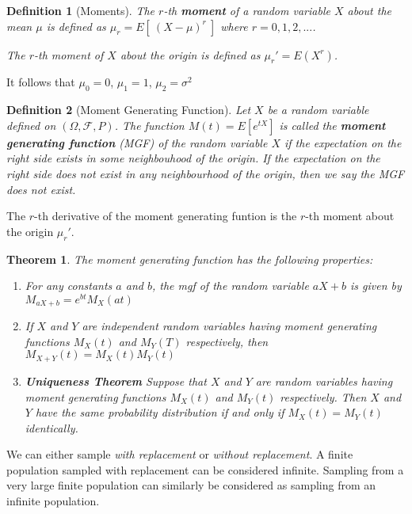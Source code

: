\documentclass[12pt,twoside]{report}
\newtheorem{defn}{Definition}
\newtheorem{thm}[subsection]{Theorem}
\begin{document}
\begin{defn}[Moments]
    The $r$-th \textbf{moment} of a random variable $X$ about the mean $\mu$ is defined as $\mu_r = E[\  (X - \mu)^r \ ]$ where $r=0, 1, 2, ...$. 

    The $r$-th moment of $X$ about the origin is defined as $\mu_r ' = E(X^r)$.
\end{defn}

It follows that $\mu_0 = 0$, $\mu_1 = 1$, $\mu_2 = \sigma ^2$

\begin{samepage}
\begin{defn}[Moment Generating Function]
    Let $X$ be a random variable defined on $\left (\Omega,  \mathcal{F}, P\right )$. The function $M\left (t\right ) = E\left [e ^{t X}\right ]$ is called the \textbf{moment generating function} (MGF) of the random variable $X$ if the expectation on the right side exists in some neighbouhood of the origin. If the expectation on the right side does not exist in any neighbourhood of the origin, then we say the MGF does not exist.
\end{defn}

The $r$-th derivative of the moment generating funtion is the $r$-th moment about the origin $\mu_r '$.
\end{samepage}

\begin{thm}
    The moment generating function has the following properties:
    \begin{enumerate}
        \item For any constants $a$ and $b$, the mgf of the random variable $a X + b$ is given by $M_{aX+b} = e^{bt} M_X(at)$
        \item If $X$ and $Y$ are independent random variables having moment generating functions $M_X(t)$ and $M_Y(T)$ respectively, then $M_{X+Y}(t) = M_X(t) M_Y(t)$
        \item \textbf{Uniqueness Theorem} Suppose that $X$ and $Y$ are random variables having moment generating functions $M_X(t)$ and $M_Y(t)$ respectively. Then $X$ and $Y$ have the same probability distribution if and only if $M_X(t) = M_Y(t)$ identically.
    \end{enumerate}
\end{thm}

We can either sample \textit{with replacement} or \textit{without replacement}. A finite population sampled with replacement can be considered infinite. Sampling from a very large finite population can similarly be considered as sampling from an infinite population. 
\end{document}
